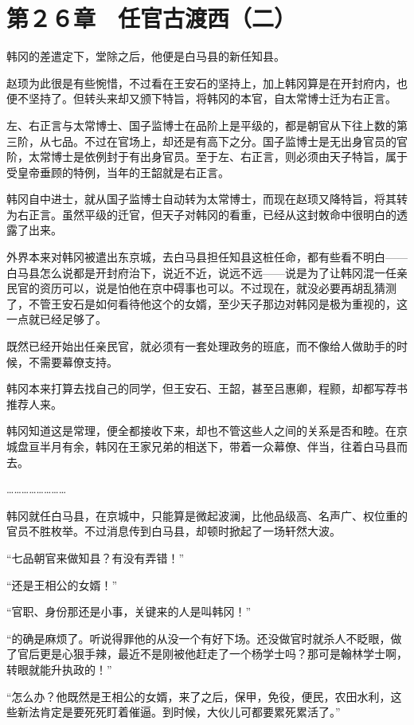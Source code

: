 \section{第２６章　任官古渡西（二）}

韩冈的差遣定下，堂除之后，他便是白马县的新任知县。

赵顼为此很是有些惋惜，不过看在王安石的坚持上，加上韩冈算是在开封府内，也便不坚持了。但转头来却又颁下特旨，将韩冈的本官，自太常博士迁为右正言。

左、右正言与太常博士、国子监博士在品阶上是平级的，都是朝官从下往上数的第三阶，从七品。不过在官场上，却还是有高下之分。国子监博士是无出身官员的官阶，太常博士是依例封于有出身官员。至于左、右正言，则必须由天子特旨，属于受皇帝垂顾的特例，当年的王韶就是右正言。

韩冈自中进士，就从国子监博士自动转为太常博士，而现在赵顼又降特旨，将其转为右正言。虽然平级的迁官，但天子对韩冈的看重，已经从这封敇命中很明白的透露了出来。

外界本来对韩冈被遣出东京城，去白马县担任知县这桩任命，都有些看不明白——白马县怎么说都是开封府治下，说近不近，说远不远——说是为了让韩冈混一任亲民官的资历可以，说是怕他在京中碍事也可以。不过现在，就没必要再胡乱猜测了，不管王安石是如何看待他这个的女婿，至少天子那边对韩冈是极为重视的，这一点就已经足够了。

既然已经开始出任亲民官，就必须有一套处理政务的班底，而不像给人做助手的时候，不需要幕僚支持。

韩冈本来打算去找自己的同学，但王安石、王韶，甚至吕惠卿，程颢，却都写荐书推荐人来。

韩冈知道这是常理，便全都接收下来，却也不管这些人之间的关系是否和睦。在京城盘亘半月有余，韩冈在王家兄弟的相送下，带着一众幕僚、伴当，往着白马县而去。

……………………

韩冈就任白马县，在京城中，只能算是微起波澜，比他品级高、名声广、权位重的官员不胜枚举。不过消息传到白马县，却顿时掀起了一场轩然大波。

“七品朝官来做知县？有没有弄错！”

“还是王相公的女婿！”

“官职、身份那还是小事，关键来的人是叫韩冈！”

“的确是麻烦了。听说得罪他的从没一个有好下场。还没做官时就杀人不眨眼，做了官后更是心狠手辣，最近不是刚被他赶走了一个杨学士吗？那可是翰林学士啊，转眼就能升执政的！”

“怎么办？他既然是王相公的女婿，来了之后，保甲，免役，便民，农田水利，这些新法肯定是要死死盯着催逼。到时候，大伙儿可都要累死累活了。”

